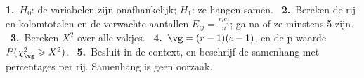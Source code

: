 \begin{werkwijze}
\textbf{1.}~$H_0$: de variabelen zijn onafhankelijk; $H_1$: ze hangen samen. \ \textbf{2.}~Bereken de rij- en kolomtotalen en de verwachte aantallen $E_{ij} = \frac{r_i c_j}{n}$; ga na of ze minstens 5 zijn. \ \textbf{3.}~Bereken $X^2$ over alle vakjes. \ \textbf{4.}~$\vg = (r - 1)(c - 1)$, en de p-waarde $P(\chi^2_{\vg} \geqslant X^2)$. \ \textbf{5.}~Besluit in de context, en beschrijf de samenhang met percentages per rij. Samenhang is geen oorzaak.
\end{werkwijze}

\begin{oefeningen}
\end{oefeningen}

\opdrachtenkop

\begin{oefeningen}























\end{oefeningen}

